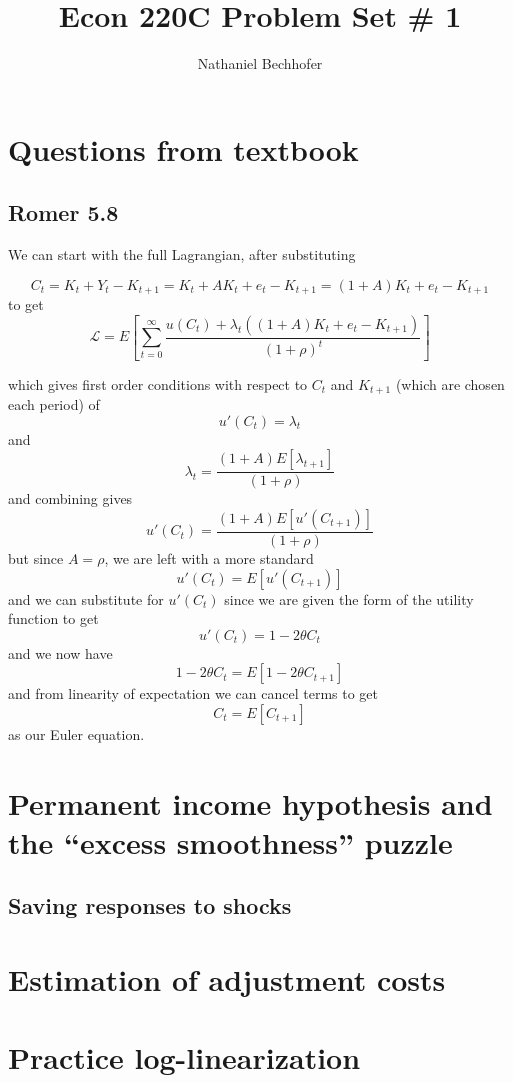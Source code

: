 \documentclass[11pt]{amsart}
\title{Econ 220C Problem Set \# 1}
\author{Nathaniel Bechhofer}
\begin{document}
	


	
\maketitle

\section{Questions from textbook}

\subsection{Romer 5.8}

We can start with the full Lagrangian, after substituting

\[
C_t = K_t + Y_t - K_{t+1} =  K_t + A K_t + e_t - K_{t+1}  = (1 + A) K_t + e_t - K_{t+1}
\]
to get
\[
\mathcal{L} = E \left[ \sum_{t=0}^{\infty} \frac{u(C_t) + \lambda_t ((1 + A) K_t + e_t - K_{t+1})}{(1+\rho)^t} \right]
\]

which gives first order conditions with respect to $C_t$ and $K_{t+1}$ (which are chosen each period) of 
\[
u'(C_t) = \lambda_t
\]
and
\[
\lambda_t = \frac{(1+A) E[\lambda_{t+1}]}{(1+\rho)}
\]
and combining gives
\[
u'(C_t) = \frac{(1+A) E[u'(C_{t+1})]}{(1+\rho)}
\]
but since $A=\rho$, we are left with a more standard
\[
u'(C_t) = E[u'(C_{t+1})]
\]
and we can substitute for $u'(C_t)$ since we are given the form of the utility function to get 
\[
u'(C_t) = 1 - 2 \theta C_t
\]
and we now have 
\[
1 - 2 \theta C_t = E[1 - 2 \theta C_{t+1}]
\] 
and from linearity of expectation we can cancel terms to get
\[
C_t = E[C_{t+1}]
\]
as our Euler equation.

\section{Permanent income hypothesis and the ``excess smoothness'' puzzle}

\subsection{Saving responses to shocks}

\section{Estimation of adjustment costs}

\section{Practice log-linearization}
\end{document}
